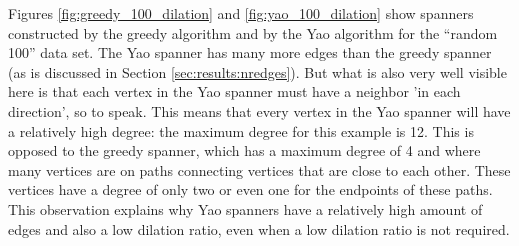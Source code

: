 \documentclass[a4paper,twoside,11pt,hidelinks]{article}
\theoremstyle{plain}
\theoremstyle{definition}  %
\begin{document}
Figures \ref{fig:greedy_100_dilation} and \ref{fig:yao_100_dilation} show spanners constructed by the greedy algorithm and by the Yao algorithm for the ``random 100'' data set. The Yao spanner has many more edges than the greedy spanner (as is discussed in Section \ref{sec:results:nredges}). But what is also very well visible here is that each vertex in the Yao spanner must have a neighbor 'in each direction', so to speak. This means that every vertex in the Yao spanner will have a relatively high degree: the maximum degree for this example is 12. This is opposed to the greedy spanner, which has a maximum degree of 4 and where many vertices are on paths connecting vertices that are close to each other. These vertices have a degree of only two or even one for the endpoints of these paths. This observation explains why Yao spanners have a relatively high amount of edges and also a low dilation ratio, even when a low dilation ratio is not required.
\end{document}
